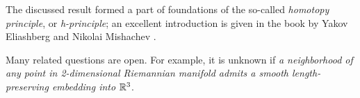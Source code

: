 The discussed result formed a part of foundations of the so-called \emph{homotopy principle}, or \emph{h-principle}; an excellent introduction is given in the book by Yakov Eliashberg and Nikolai Mishachev \cite{eliashberg-mishachev}.

Many related questions are open.
For example, it is unknown if \emph{a neighborhood of any point in 2-dimensional Riemannian manifold admits a smooth length-preserving embedding into $\mathbb{R}^3$}. 






